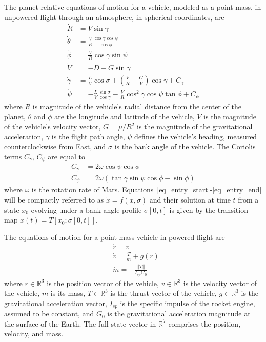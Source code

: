\documentclass[letterpaper, preprint, paper,11pt]{AAS}
\begin{document}
The planet-relative equations of motion for a vehicle, modeled as a point mass, in unpowered flight through an atmosphere, in spherical coordinates, are
\begin{align}
\dot{R} &= V\sin\gamma \label{eq_entry_start}\\
\dot{\theta} &= \frac{V}{R}\frac{\cos\gamma\cos\psi}{\cos\phi}\\
\dot{\phi} &= \frac{V}{R}\cos\gamma\sin\psi \\
\dot{V} &= -D - G\sin\gamma \\
\dot{\gamma} &= \frac{L}{V}\cos\sigma + (\frac{V}{R}-\frac{G}{V})\cos\gamma + C_{\gamma}\\
\dot{\psi} &= -\frac{L}{V}\frac{\sin\sigma}{\cos\gamma} - \frac{V}{R}\cos^2\gamma\cos\psi\tan\phi + C_{\psi}\label{eq_entry_end}
\end{align}
where $R$ is magnitude of the vehicle's radial distance from the center of the planet, $\theta$ and $\phi$ are the longitude and latitude of the vehicle, $V$ is the magnitude of the vehicle's velocity vector,  $G=\mu/R^2$ is the magnitude of the gravitational acceleration, $\gamma$ is the flight path angle, $\psi$ defines the vehicle's heading, measured counterclockwise from East, and $\sigma$ is the bank angle of the vehicle. The Coriolis terms $C_{\gamma},\,C_{\psi}$ are equal to
\begin{align}
C_{\gamma} &= 2\omega\cos\psi\cos\phi \\
C_{\psi} &= 2\omega(\tan\gamma\sin\psi\cos\phi-\sin\phi)
\end{align}
where $\omega$ is the rotation rate of Mars. Equations~\ref{eq_entry_start}-\ref{eq_entry_end} will be compactly referred to as $\dot{x} = f(x,\sigma)$ and their solution at time $t$ from a state $x_0$ evolving under a bank angle profile $\sigma[0,t]$ is given by the transition map $x(t) = T[x_0;\sigma[0,t]]$.

The equations of motion for a point mass vehicle in powered flight are
\begin{align}
&\dot{r} = v \label{eq_eom_srp} \\
&\dot{v} = \frac{T}{m} + g(r) \\
&\dot{m} = -\frac{||T||}{I_{sp}G_0} \label{eq_eom_srp_end}
\end{align}
where $r\in\mathbb{R}^3$ is the position vector of the vehicle, $v\in\mathbb{R}^3$ is the velocity vector of the vehicle, $m$ is its mass, $T\in\mathbb{R}^3$ is the thrust vector of the vehicle, $g\in\mathbb{R}^3$ is the gravitational acceleration vector, $I_{sp}$ is the specific impulse of the rocket engine, assumed to be constant, and $G_0$ is the gravitational acceleration magnitude at the surface of the Earth. The full state vector in $\mathbb{R}^7$ comprises the position, velocity, and mass. 
\end{document}
